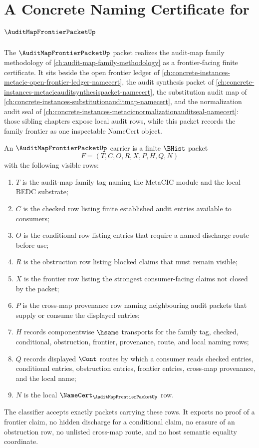 \chapter{A Concrete Naming Certificate for $\AuditMapFrontierPacketUp$}
\label{ch:concrete-instances-auditmapfrontierpacket-namecert}

The $\AuditMapFrontierPacketUp$ packet realizes the audit-map family methodology of \autoref{ch:audit-map-family-methodology} as a frontier-facing finite certificate. It sits beside the open frontier ledger of \autoref{ch:concrete-instances-metacic-open-frontier-ledger-namecert}, the audit synthesis packet of \autoref{ch:concrete-instances-metacicauditsynthesispacket-namecert}, the substitution audit map of \autoref{ch:concrete-instances-substitutionauditmap-namecert}, and the normalization audit seal of \autoref{ch:concrete-instances-metacicnormalizationauditseal-namecert}: those sibling chapters expose local audit rows, while this packet records the family frontier as one inspectable NameCert object.

\begin{definition}
\label{def:audit-map-frontier-packet-carrier}
An $\AuditMapFrontierPacketUp$ carrier is a finite $\BHist$ packet
$$
F=(T,C,O,R,X,P,H,Q,N)
$$
with the following visible rows:
\begin{enumerate}
\item $T$ is the audit-map family tag naming the MetaCIC module and the local BEDC substrate;
\item $C$ is the checked row listing finite established audit entries available to consumers;
\item $O$ is the conditional row listing entries that require a named discharge route before use;
\item $R$ is the obstruction row listing blocked claims that must remain visible;
\item $X$ is the frontier row listing the strongest consumer-facing claims not closed by the packet;
\item $P$ is the cross-map provenance row naming neighbouring audit packets that supply or consume the displayed entries;
\item $H$ records componentwise $\hsame$ transports for the family tag, checked, conditional, obstruction, frontier, provenance, route, and local naming rows;
\item $Q$ records displayed $\Cont$ routes by which a consumer reads checked entries, conditional entries, obstruction entries, frontier entries, cross-map provenance, and the local name;
\item $N$ is the local $\NameCert_{\AuditMapFrontierPacketUp}$ row.
\end{enumerate}
The classifier accepts exactly packets carrying these rows. It exports no proof of a frontier claim, no hidden discharge for a conditional claim, no erasure of an obstruction row, no unlisted cross-map route, and no host semantic equality coordinate.
\end{definition}

